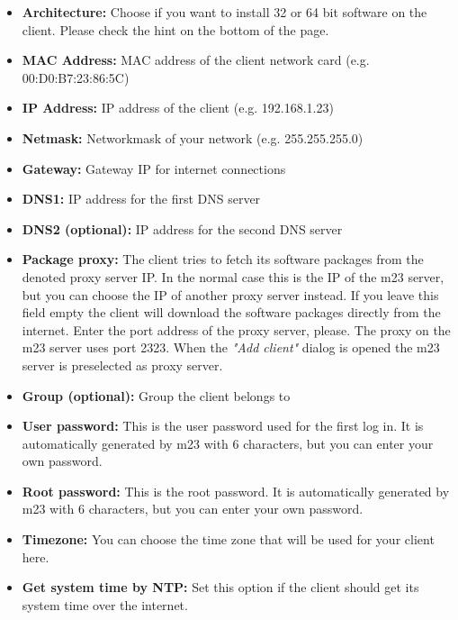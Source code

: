 \begin{itemize}
\item \textbf{Architecture:} Choose if you want to install 32 or 64 bit software on the client. Please check the hint on the bottom of the page.\\
\item \textbf{MAC Address:} MAC address of the client network card (e.g. 00:D0:B7:23:86:5C)\\
\item \textbf{IP Address:} IP address of the client (e.g. 192.168.1.23)\\
\item \textbf{Netmask:} Networkmask of your network (e.g. 255.255.255.0)\\
\item \textbf{Gateway:} Gateway IP for internet connections\\
\item \textbf{DNS1:} IP address for the first DNS server\\
\item \textbf{DNS2 (optional):} IP address for the second DNS server\\
\item \textbf{Package proxy:} The client tries to fetch its software packages from the denoted proxy server IP. In the normal case this is the IP of the m23 server, but you can choose the IP of another proxy server instead. If you leave this field empty the client will download the software packages directly from the internet. Enter the port address of the proxy server, please. The proxy on the m23 server uses port 2323. When the \textit{"Add client"} dialog is opened the m23 server is preselected as proxy server.\\
\item \textbf{Group (optional):} Group the client belongs to\\
\item \textbf{User password:} This is the user password used for the first log in. It is automatically generated by m23 with 6 characters, but you can enter your own password.\\
\item \textbf{Root password:} This is the root password. It is automatically generated by m23 with 6 characters, but you can enter your own password.\\
\item \textbf{Timezone:} You can choose the time zone that will be used for your client here.\\
\item \textbf{Get system time by NTP:} Set this option if the client should get its system time over the internet.\\

\end{itemize}
